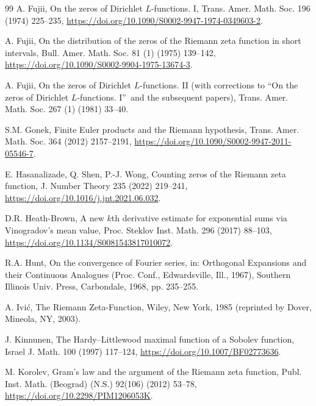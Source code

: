 \documentclass[preprint,12pt]{elsarticle}
\numberwithin{equation}{section}
\theoremstyle{plain}
\theoremstyle{definition}
\theoremstyle{remark}
\begin{document}
\begin{thebibliography}{99}
A. Fujii, On the zeros of Dirichlet $L$-functions. I, Trans. Amer. Math. Soc. 196 (1974) 225--235, \href{https://doi.org/10.1090/S0002-9947-1974-0349603-2}{https://doi.org/10.1090/S0002-9947-1974-0349603-2}.

A. Fujii, On the distribution of the zeros of the Riemann zeta function in short intervals, Bull. Amer. Math. Soc. 81 (1) (1975) 139--142, \href{https://doi.org/10.1090/S0002-9904-1975-13674-3}{https://doi.org/10.1090/S0002-9904-1975-13674-3}.

A. Fujii, On the zeros of Dirichlet $L$-functions. II (with corrections to ``On the zeros of Dirichlet $L$-functions. I\textquotedblright\ and the subsequent papers), Trans. Amer. Math. Soc. 267 (1) (1981) 33--40.

S.M. Gonek, Finite Euler products and the Riemann hypothesis, Trans. Amer. Math. Soc. 364 (2012) 2157--2191, \href{https://doi.org/10.1090/S0002-9947-2011-05546-7}{https://doi.org/10.1090/S0002-9947-2011-05546-7}.

E. Hasanalizade, Q. Shen, P.-J. Wong, Counting zeros of the Riemann zeta function, J. Number Theory 235 (2022) 219--241, \href{https://doi.org/10.1016/j.jnt.2021.06.032}{https://doi.org/10.1016/j.jnt.2021.06.032}.

D.R. Heath-Brown, A new $k$th derivative estimate for exponential sums via Vinogradov's mean value, Proc. Steklov Inst. Math. 296 (2017) 88--103, \href{https://doi.org/10.1134/S0081543817010072}{https://doi.org/10.1134/S0081543817010072}.

R.A. Hunt, On the convergence of Fourier series, in: Orthogonal Expansions and their Continuous Analogues (Proc. Conf., Edwardsville, Ill., 1967), Southern Illinois Univ. Press, Carbondale, 1968, pp. 235--255.

A. Ivi\'c, The Riemann Zeta-Function, Wiley, New York, 1985 (reprinted by Dover, Mineola, NY, 2003).

J. Kinnunen, The Hardy--Littlewood maximal function of a Sobolev function, Israel J. Math. 100 (1997) 117--124, \href{https://doi.org/10.1007/BF02773636}{https://doi.org/10.1007/BF02773636}.

M. Korolev, Gram's law and the argument of the Riemann zeta function, Publ. Inst. Math. (Beograd) (N.S.) 92(106) (2012) 53--78, \href{https://doi.org/10.2298/PIM1206053K}{https://doi.org/10.2298/PIM1206053K}.


\end{thebibliography}
\end{document}
